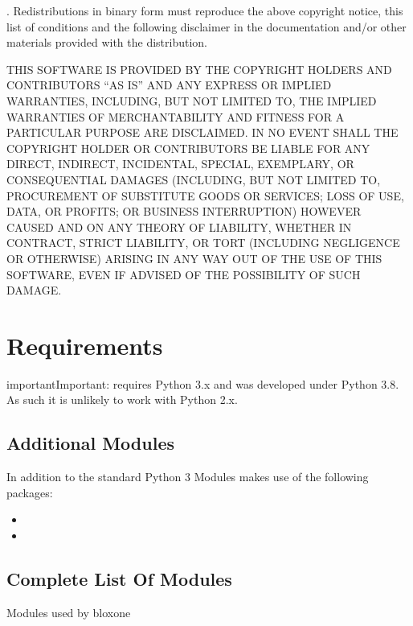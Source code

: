 \documentclass[letterpaper,10pt,english]{sphinxmanual}
\begin{document}
. Redistributions in binary form must reproduce the above copyright
notice, this list of conditions and the following disclaimer in the
documentation and/or other materials provided with the distribution.

\sphinxAtStartPar
THIS SOFTWARE IS PROVIDED BY THE COPYRIGHT HOLDERS AND CONTRIBUTORS
“AS IS” AND ANY EXPRESS OR IMPLIED WARRANTIES, INCLUDING, BUT NOT
LIMITED TO, THE IMPLIED WARRANTIES OF MERCHANTABILITY AND FITNESS
FOR A PARTICULAR PURPOSE ARE DISCLAIMED. IN NO EVENT SHALL THE
COPYRIGHT HOLDER OR CONTRIBUTORS BE LIABLE FOR ANY DIRECT, INDIRECT,
INCIDENTAL, SPECIAL, EXEMPLARY, OR CONSEQUENTIAL DAMAGES (INCLUDING,
BUT NOT LIMITED TO, PROCUREMENT OF SUBSTITUTE GOODS OR SERVICES;
LOSS OF USE, DATA, OR PROFITS; OR BUSINESS INTERRUPTION) HOWEVER
CAUSED AND ON ANY THEORY OF LIABILITY, WHETHER IN CONTRACT, STRICT
LIABILITY, OR TORT (INCLUDING NEGLIGENCE OR OTHERWISE) ARISING IN
ANY WAY OUT OF THE USE OF THIS SOFTWARE, EVEN IF ADVISED OF THE
POSSIBILITY OF SUCH DAMAGE.


\chapter{Requirements}
\label{\detokenize{requirements:requirements}}\label{\detokenize{requirements::doc}}
\begin{sphinxadmonition}{important}{Important:}
\sphinxAtStartPar
{} requires Python 3.x and was developed under Python 3.8. As such it is unlikely to work with Python 2.x.
\end{sphinxadmonition}


\section{Additional Modules}
\label{\detokenize{requirements:additional-modules}}
\sphinxAtStartPar
In addition to the standard Python 3 Modules  makes use of
the following packages:
\begin{itemize}
\item {} 
\sphinxAtStartPar
{}

\item {} 
\sphinxAtStartPar
{}

\end{itemize}


\section{Complete List Of Modules}
\label{\detokenize{requirements:complete-list-of-modules}}
\sphinxAtStartPar
Modules used by bloxone
\end{document}
